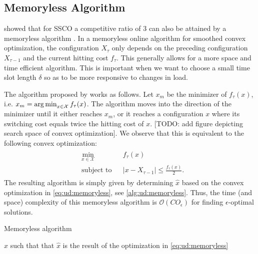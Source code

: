 \subsection{Memoryless Algorithm}

\citeauthor*{Bansal2015} showed that for SSCO a competitive ratio of $3$ can also be attained by a memoryless algorithm \cite{Bansal2015}. In a memoryless online algorithm for smoothed convex optimization, the configuration $X_{\tau}$ only depends on the preceding configuration $X_{\tau-1}$ and the current hitting cost $f_{\tau}$. This generally allows for a more space and time efficient algorithm. This is important when we want to choose a small time slot length $\delta$ so as to be more responsive to changes in load.

The algorithm proposed by \citeauthor*{Bansal2015} works as follows. Let $x_m$ be the minimizer of $f_{\tau}(x)$, i.e. $x_m = \operatorname*{arg\,min}_{x \in \mathcal{X}} f_{\tau}(x)$. The algorithm moves into the direction of the minimizer until it either reaches $x_m$, or it reaches a configuration $x$ where its switching cost equals twice the hitting cost of $x$. [TODO: add figure depicting search space of convex optimization]. We observe that this is equivalent to the following convex optimization: \begin{align}\label{eq:ud:memoryless}\begin{aligned}
    &\min_{x \in \mathcal{X}} &&f_{\tau}(x) \\
    &\text{subject to}        &&|x - X_{\tau-1}| \leq \frac{f_{\tau}(x)}{2}.
\end{aligned}\end{align} The resulting algorithm is simply given by determining $\hat{x}$ based on the convex optimization in \autoref{eq:ud:memoryless}, see \autoref{alg:ud:memoryless}. Thus, the time (and space) complexity of this memoryless algorithm is $\mathcal{O}(C O_{\epsilon})$ for finding $\epsilon$-optimal solutions.

\begin{algorithm}
    \caption{Memoryless algorithm \cite{Bansal2015}}\label{alg:ud:memoryless}
    \Return $\hat{x}$ such that that $\hat{x}$ is the result of the optimization in \autoref{eq:ud:memoryless}\;
\end{algorithm}

